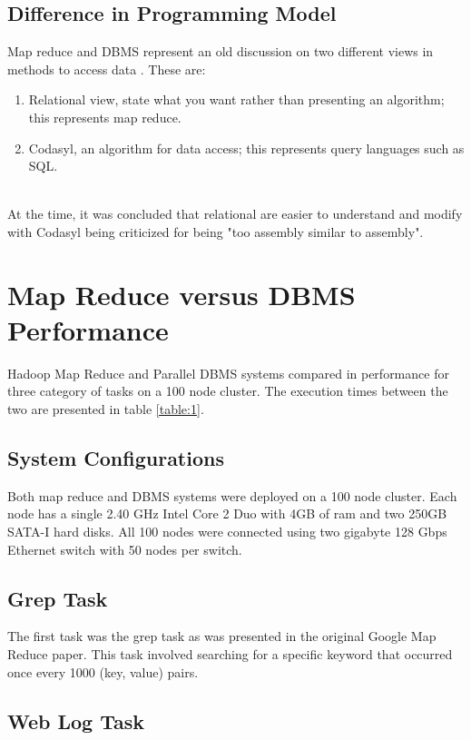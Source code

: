 \documentclass[10pt,twocolumn]{IEEEtran11}
\begin{document}
\subsection{Difference in Programming Model}
Map reduce and DBMS represent an old discussion on two different views in methods to access data \cite{pavlo2009comparison}.  These are:
\  \\
\begin{enumerate}
	\setlength\itemsep{1em}
	\item Relational view, state what you want rather than presenting an algorithm; this represents map reduce.
	\item Codasyl, an algorithm for data access; this represents query languages such as SQL.
\end{enumerate} 
\  \\
At the time, it was concluded that relational are easier to understand and modify with Codasyl being criticized for being "too assembly similar to assembly".  

\section{Map Reduce versus DBMS Performance}

Hadoop Map Reduce and Parallel DBMS systems compared in performance for three category of tasks on a 100 node cluster.  The execution times between the two are presented in table \ref{table:1}.  

\subsection{System Configurations}
Both map reduce and DBMS systems were deployed on a 100 node cluster.  Each node has a single 2.40 GHz Intel Core 2 Duo with 4GB of ram and two 250GB SATA-I hard disks.  All 100 nodes were connected using two gigabyte 128 Gbps Ethernet switch with 50 nodes per switch.

\subsection{Grep Task}

The first task was the grep task as was presented in the original Google Map Reduce paper.  This task involved searching for a specific keyword that occurred once every 1000 (key, value) pairs. 
\subsection{Web Log Task}
\end{document}
